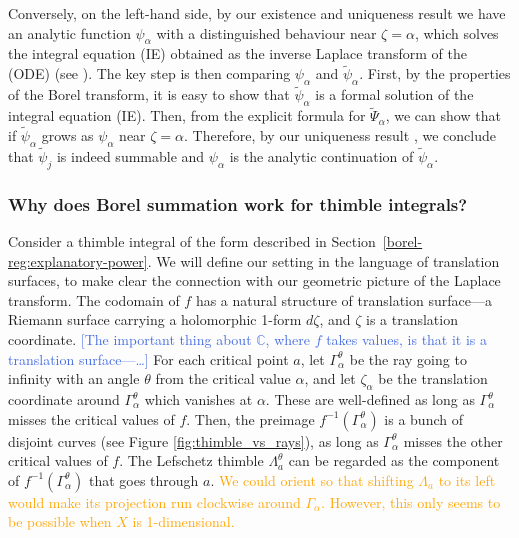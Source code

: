 \documentclass{article}
\newcommand{\C}{\mathbb{C}}
\newcommand{\series}[1]{\tilde{#1}}
\theoremstyle{definition}
\theoremstyle{plain}
\begin{document}
Conversely, on the left-hand side, by our existence and uniqueness result \cite[Theorem 4]{reg-sing-volterra} we have an analytic function $\psi_\alpha$ with a distinguished behaviour near $\zeta=\alpha$, which solves the integral equation (IE) obtained as the inverse Laplace transform of the (ODE) (see \cite[Lemma 2]{reg-sing-volterra}). The key step is then comparing $\psi_\alpha$ and $\tilde{\psi}_\alpha$. First, by the properties of the Borel transform, it is easy to show that $\series{\psi}_\alpha$ is a formal solution of the integral equation (IE). Then, from the explicit formula for $\tilde{\Psi}_\alpha$, we can show that if $\tilde{\psi}_\alpha$ grows as $\psi_\alpha$ near $\zeta=\alpha$. Therefore, by our uniqueness result \cite[Theorem 4]{reg-sing-volterra}, we conclude that $\tilde{\psi}_j$ is indeed summable and ${\psi}_\alpha$ is the analytic continuation of $\tilde{\psi}_\alpha$.

\subsubsection{Why does Borel summation work for thimble integrals?}
Consider a thimble integral of the form described in Section~\ref{borel-reg:explanatory-power}. We will define our setting in the language of translation surfaces, to make clear the connection with our geometric picture of the Laplace transform. The codomain of $f$ has a natural structure of translation surface---a Riemann surface carrying a holomorphic 1-form $d\zeta$, and $\zeta$ is a translation coordinate. \textcolor{RoyalBlue}{[The important thing about $\C$, where $f$ takes values, is that it is a translation surface---\ldots]} For each critical point $a$, let $\Gamma_\alpha^\theta$ be the ray going to infinity with an angle $\theta$ from the critical value $\alpha$, and let $\zeta_{\alpha}$ be the translation coordinate around $\Gamma_\alpha^\theta$ which vanishes at $\alpha$. These are well-defined as long as $\Gamma_\alpha^\theta$ misses the critical values of $f$. Then, the preimage $f^{-1}(\Gamma_\alpha^\theta)$ is a bunch of disjoint curves (see Figure \ref{fig:thimble_vs_rays}), as long as $\Gamma_\alpha^\theta$ misses the other critical values of $f$. The Lefschetz thimble $\Lambda_a^\theta$ can be regarded as the component of $f^{-1}(\Gamma_\alpha^\theta)$ that goes through $a$.  \textcolor{orange}{We could orient so that shifting $\Lambda_a$ to its left would make its projection run clockwise around $\Gamma_\alpha$. However, this only seems to be possible when $X$ is 1-dimensional.} 
\end{document}

